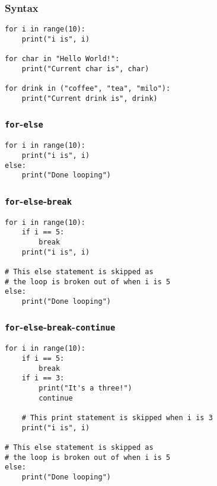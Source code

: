 \documentclass[11pt]{article}
\begin{document}
\subsubsection{Syntax}
\label{sec:org0df967e}
\begin{verbatim}
for i in range(10):
    print("i is", i)

for char in "Hello World!":
    print("Current char is", char)

for drink in ("coffee", "tea", "milo"):
    print("Current drink is", drink)
\end{verbatim}
\subsubsection{\texttt{for}-\texttt{else}}
\label{sec:orge8086b8}
\begin{verbatim}
for i in range(10):
    print("i is", i)
else:
    print("Done looping")
\end{verbatim}
\subsubsection{\texttt{for}-\texttt{else}-\texttt{break}}
\label{sec:orgaedeb42}
\begin{verbatim}
for i in range(10):
    if i == 5:
        break
    print("i is", i)

# This else statement is skipped as
# the loop is broken out of when i is 5
else:
    print("Done looping")
\end{verbatim}
\subsubsection{\texttt{for}-\texttt{else}-\texttt{break}-\texttt{continue}}
\label{sec:org99033cb}
\begin{verbatim}
for i in range(10):
    if i == 5:
        break
    if i == 3:
        print("It's a three!")
        continue

    # This print statement is skipped when i is 3
    print("i is", i)

# This else statement is skipped as
# the loop is broken out of when i is 5
else:
    print("Done looping")
\end{verbatim}
\end{document}
